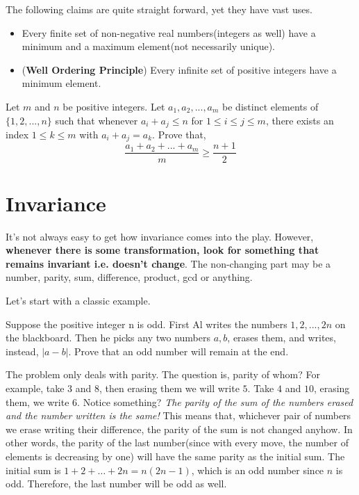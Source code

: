 \documentclass[nt_billal_v1.tex]{subfile}
\begin{document}
The following claims are quite straight forward, yet they have vast uses.

\begin{itemize}
	\item Every finite set of non-negative real numbers(integers as well) have a minimum and a maximum element(not necessarily unique).
	\item(\textbf{Well Ordering Principle}) Every infinite set of positive integers have a minimum element.
\end{itemize}

\begin{problem}
	Let $m$ and $n$ be positive integers. Let $a_1,a_2,...,a_m$ be distinct elements of $\{1,2,...,n\}$ such that whenever $a_i+a_j\leq n$ for $1\leq i\leq 
	j\leq m$, there exists an index $1\leq k\leq m$ with $a_i+a_j=a_k$. Prove that, 
	\[\dfrac{a_1+a_2+...+a_m}{m}\geq\dfrac{n+1}{2}\]
\end{problem}

\begin{solution}
	
\end{solution}


\section{Invariance}
It's not always easy to get how invariance comes into the play. However, \textbf{whenever there is some transformation, look for something that remains invariant i.e. doesn't change}. The non-changing part may be a number, parity, sum, difference, product, gcd or anything.

Let's start with a classic example.

\begin{problem}
	Suppose the positive integer n is odd. First Al writes the numbers $1, 2, . . . , 2n$ on the blackboard. Then he picks any two numbers $a, b$, erases them, and writes, instead, $|a-b|$. Prove that an odd number will remain at the end.
\end{problem}

\begin{solution}
	The problem only deals with parity. The question is, parity of whom? For example, take $3$ and $8$, then erasing them we will write $5$. Take $4$ and $10$, erasing them, we write $6$. Notice something? \textit{The parity of the sum of the numbers erased and the number written is the same!} This means that, whichever pair of numbers we erase writing their difference, the parity of the sum is not changed anyhow. In other words, the parity of the last number(since with every move, the number of elements is decreasing by one) will have the same parity as the initial sum. The initial sum is $1+2+\ldots+2n=n(2n-1)$, which is an odd number since $n$ is odd. Therefore, the last number will be odd as well.
\end{solution}
\end{document}
